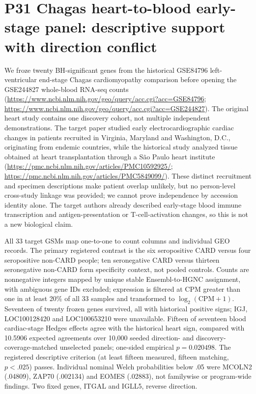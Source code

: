 \documentclass[11pt,a4paper]{article}
\begin{document}
\section{P31 Chagas heart-to-blood early-stage panel: descriptive support with direction conflict}
We froze twenty BH-significant genes from the historical GSE84796 left-ventricular end-stage Chagas cardiomyopathy comparison before opening the GSE244827 whole-blood RNA-seq counts (\url{https://www.ncbi.nlm.nih.gov/geo/query/acc.cgi?acc=GSE84796}; \url{https://www.ncbi.nlm.nih.gov/geo/query/acc.cgi?acc=GSE244827}). The original heart study contains one discovery cohort, not multiple independent demonstrations. The target paper studied early electrocardiographic cardiac changes in patients recruited in Virginia, Maryland and Washington, D.C., originating from endemic countries, while the historical study analyzed tissue obtained at heart transplantation through a São Paulo heart institute (\url{https://pmc.ncbi.nlm.nih.gov/articles/PMC10592925/}; \url{https://pmc.ncbi.nlm.nih.gov/articles/PMC5849099/}). These distinct recruitment and specimen descriptions make patient overlap unlikely, but no person-level cross-study linkage was provided; we cannot prove independence by accession identity alone. The target authors already described early-stage blood immune transcription and antigen-presentation or T-cell-activation changes, so this is not a new biological claim.

All 33 target GSMs map one-to-one to count columns and individual GEO records. The primary registered contrast is the six seropositive CARD versus four seropositive non-CARD people; ten seronegative CARD versus thirteen seronegative non-CARD form specificity context, not pooled controls. Counts are nonnegative integers mapped by unique stable Ensembl-to-HGNC assignment, with ambiguous gene IDs excluded; expression is filtered at CPM greater than one in at least 20\% of all 33 samples and transformed to $\log_2(\mathrm{CPM}+1)$. Seventeen of twenty frozen genes survived, all with historical positive signs; IGJ, LOC100128420 and LOC100653210 were unavailable. Fifteen of seventeen blood cardiac-stage Hedges effects agree with the historical heart sign, compared with 10.5906 expected agreements over 10,000 seeded direction- and discovery-coverage-matched unselected panels; one-sided empirical $p=0.020498$. The registered descriptive criterion (at least fifteen measured, fifteen matching, $p<.025$) passes. Individual nominal Welch probabilities below .05 were MCOLN2 (.04809), ZAP70 (.002134) and EOMES (.02883), not familywise or program-wide findings. Two fixed genes, ITGAL and IGLL5, reverse direction.
\end{document}
